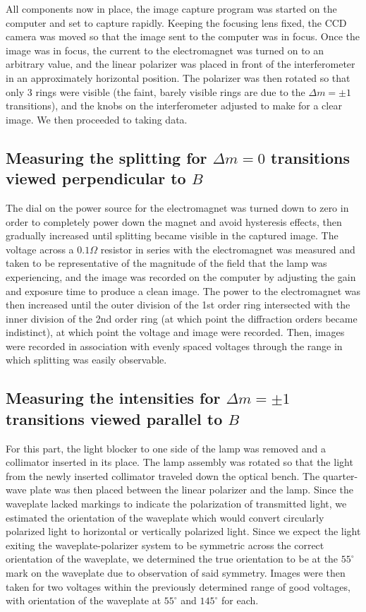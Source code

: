 \documentclass{amsart}
\begin{document}
All components now in place, the image capture program was started on the computer and set to capture rapidly. Keeping the focusing lens fixed, the CCD camera was moved so that the image sent to the computer was in focus. Once the image was in focus, the current to the electromagnet was turned on to an arbitrary value, and the linear polarizer was placed in front of the interferometer in an approximately horizontal position. The polarizer was then rotated so that only $3$ rings were visible (the faint, barely visible rings are due to the $\Delta m=\pm1$ transitions), and the knobs on the interferometer adjusted to make for a clear image. We then proceeded to taking data.
\subsection{Measuring the splitting for $\Delta m=0$ transitions viewed perpendicular to $B$}
The dial on the power source for the electromagnet was turned down to zero in order to completely power down the magnet and avoid hysteresis effects, then gradually increased until splitting became visible in the captured image. The voltage across a $0.1\Omega$ resistor in series with the electromagnet was measured and taken to be representative of the magnitude of the field that the lamp was experiencing, and the image was recorded on the computer by adjusting the gain and exposure time to produce a clean image. The power to the electromagnet was then increased until the outer division of the 1st order ring intersected with the inner division of the 2nd order ring (at which point the diffraction orders became indistinct), at which point the voltage and image were recorded. Then, images were recorded in association with evenly spaced voltages through the range in which splitting was easily observable.
\subsection{Measuring the intensities for $\Delta m=\pm1$ transitions viewed parallel to $B$}
For this part, the light blocker to one side of the lamp was removed and a collimator inserted in its place. The lamp assembly was rotated so that the light from the newly inserted collimator traveled down the optical bench. The quarter-wave plate was then placed between the linear polarizer and the lamp. Since the waveplate lacked markings to indicate the polarization of transmitted light, we estimated the orientation of the waveplate which would convert circularly polarized light to horizontal or vertically polarized light. Since we expect the light exiting the waveplate-polarizer system to be symmetric across the correct orientation of the waveplate, we determined the true orientation to be at the $55^\circ$ mark on the waveplate due to observation of said symmetry. Images were then taken for two voltages within the previously determined range of good voltages, with orientation of the waveplate at $55^\circ$ and $145^\circ$ for each.
\end{document}
